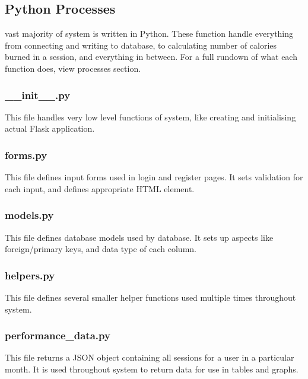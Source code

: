 \documentclass{article}[12pt,a4paper]
\begin{document}
\subsection{Python Processes}
vast majority of system is written in Python. These function handle everything from connecting and writing to database, to calculating number of calories burned in a session, and everything in between. For a full rundown of what each function does, view processes section.

\subsubsection{\_\_init\_\_.py}
This file handles very low level functions of system, like creating and initialising actual Flask application.


\subsubsection{forms.py}
This file defines input forms used in login and register pages. It sets validation for each input, and defines appropriate HTML element.


\subsubsection{models.py}
This file defines database models used by database. It sets up aspects like foreign/primary keys, and data type of each column.


\subsubsection{helpers.py}
This file defines several smaller helper functions used multiple times throughout system.


\subsubsection{performance\_data.py}
This file returns a JSON object containing all sessions for a user in a particular month. It is used throughout system to return data for use in tables and graphs.

\end{document}
